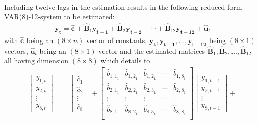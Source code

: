 \documentclass[a4paper,11pt,listof=nochaptergap,oneside,pointednumbers,bibtotoc,bigheadings,liststotoc]{scrbook}
\theoremstyle{mysatz}
\theoremstyle{mydefinition}
\theoremstyle{mybemerkung}
\let\oldhat\hat
\newcommand{\vect}[1]{\boldsymbol{\mathbf{#1}}}
\newcommand{\hatt}[1]{\oldhat{\boldsymbol{\mathbf{#1}}}}
\newcommand{\hattnobf}[1]{\oldhat{#1}}
\begin{document}
\begin{enumerate}
\begin{equation}
\begin{split}
\end{split}
\end{equation}
Including twelve lags in the estimation results in the following reduced-form VAR(8)-12-system to be estimated:
	\begin{equation} \label{eq:VAR8_1}
	\begin{split}
		\vect{y_t} = {\hatt{c}} + {\hatt{B}_1}\vect{y_{t-1}} + {\hatt{B}_2}\vect{y_{t-2}} + \cdots + {\hatt{B}_{12}}\vect{y_{t-12}} + {\hatt{u}_t}
	\end{split}								
	\end{equation}	
with ${\hatt{c}}$ being an $(8 \times n)$ vector of constants, $\vect{y_t}, \vect{y_{t-1}}, \dots, \vect{y_{t-12}}$ being $(8 \times 1)$ vectors, ${\hatt{u}_t}$ being an $(8 \times 1)$ vector and the estimated matrices ${\hatt{B}_1}, {\hatt{B}_2}, \dots, {\hatt{B}_{12}}$ all having dimension $(8 \times 8)$
which details to
	\begin{equation} \label{eq:VAR8_2}
		\begin{split}
		\begin{bmatrix}
    		y_{1,t} \\
    		y_{2,t} \\
		\vdots \\
		y_{8,t}
 		\end{bmatrix} & = 
		\begin{bmatrix}
    		\hattnobf{c}_{{1}} \\
    		\hattnobf{c}_{{2}} \\
		\vdots \\
		\hattnobf{c}_{{8}}
 		\end{bmatrix} + 
		\begin{bmatrix}
    		\hattnobf{b}_{{1,1}_1} & \hattnobf{b}_{{1,2}_1} & \hattnobf{b}_{{1,2}_1} & \cdots & \hattnobf{b}_{{1,8}_1}\\
    		\hattnobf{b}_{{2,1}_1} & \hattnobf{b}_{{2,2}_1} & \hattnobf{b}_{{2,3}_1} & \cdots & \hattnobf{b}_{{2,8}_1}\\
		\vdots & \vdots & \vdots & \cdots & \vdots \\
		\hattnobf{b}_{{8,1}_1} & \hattnobf{b}_{{8,2}_1} & \hattnobf{b}_{{8,3}_1} & \cdots & \hattnobf{b}_{{8,8}_1}\\
 		\end{bmatrix} 
		\begin{bmatrix}
    		y_{1,t-1} \\
    		y_{2,t-1} \\
		\vdots \\
		y_{8, t-1}
 		\end{bmatrix} + \\

\end{split}
\end{equation}
\end{enumerate}
\end{document}
